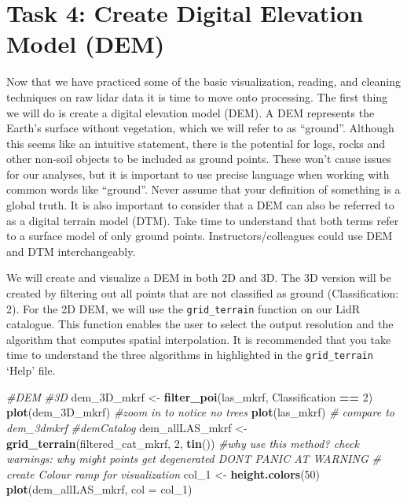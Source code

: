 \documentclass[
]{book}
\newenvironment{Shaded}{\begin{snugshade}}{\end{snugshade}}
\newcommand{\AttributeTok}[1]{\textcolor[rgb]{0.13,0.29,0.53}{#1}}
\newcommand{\CommentTok}[1]{\textcolor[rgb]{0.56,0.35,0.01}{\textit{#1}}}
\newcommand{\DecValTok}[1]{\textcolor[rgb]{0.00,0.00,0.81}{#1}}
\newcommand{\FunctionTok}[1]{\textcolor[rgb]{0.13,0.29,0.53}{\textbf{#1}}}
\newcommand{\NormalTok}[1]{#1}
\newcommand{\OtherTok}[1]{\textcolor[rgb]{0.56,0.35,0.01}{#1}}
\newcommand{\SpecialCharTok}[1]{\textcolor[rgb]{0.81,0.36,0.00}{\textbf{#1}}}
\begin{document}
\hypertarget{task-4-create-digital-elevation-model-dem}{%
\section*{Task 4: Create Digital Elevation Model (DEM)}\label{task-4-create-digital-elevation-model-dem}}

Now that we have practiced some of the basic visualization, reading, and cleaning techniques on raw lidar data it is time to move onto processing. The first thing we will do is create a digital elevation model (DEM). A DEM represents the Earth's surface without vegetation, which we will refer to as ``ground''. Although this seems like an intuitive statement, there is the potential for logs, rocks and other non-soil objects to be included as ground points. These won't cause issues for our analyses, but it is important to use precise language when working with common words like ``ground''. Never assume that your definition of something is a global truth. It is also important to consider that a DEM can also be referred to as a digital terrain model (DTM). Take time to understand that both terms refer to a surface model of only ground points. Instructors/colleagues could use DEM and DTM interchangeably.

We will create and visualize a DEM in both 2D and 3D. The 3D version will be created by filtering out all points that are not classified as ground (Classification: 2). For the 2D DEM, we will use the \texttt{grid\_terrain} function on our LidR catalogue. This function enables the user to select the output resolution and the algorithm that computes spatial interpolation. It is recommended that you take time to understand the three algorithms in highlighted in the \texttt{grid\_terrain} `Help' file.

\begin{Shaded}
\begin{Highlighting}[]
\CommentTok{\#DEM}
\CommentTok{\#3D}
\NormalTok{dem\_3D\_mkrf }\OtherTok{\textless{}{-}} \FunctionTok{filter\_poi}\NormalTok{(las\_mkrf, Classification }\SpecialCharTok{==} \DecValTok{2}\NormalTok{)}
\FunctionTok{plot}\NormalTok{(dem\_3D\_mkrf) }\CommentTok{\#zoom in to notice no trees}
\FunctionTok{plot}\NormalTok{(las\_mkrf) }\CommentTok{\# compare to dem\_3dmkrf}
\CommentTok{\#demCatalog}
\NormalTok{dem\_allLAS\_mkrf }\OtherTok{\textless{}{-}} \FunctionTok{grid\_terrain}\NormalTok{(filtered\_cat\_mkrf, }\DecValTok{2}\NormalTok{, }\FunctionTok{tin}\NormalTok{()) }\CommentTok{\#why use this method? check warnings: why might points get degenerated DON\textquotesingle{}T PANIC AT \textquotesingle{}WARNING\textquotesingle{}}
\CommentTok{\# create Colour ramp for visualization }
\NormalTok{col\_1 }\OtherTok{\textless{}{-}} \FunctionTok{height.colors}\NormalTok{(}\DecValTok{50}\NormalTok{)}
\FunctionTok{plot}\NormalTok{(dem\_allLAS\_mkrf, }\AttributeTok{col =}\NormalTok{ col\_1)}
\end{Highlighting}
\end{Shaded}
\end{document}

